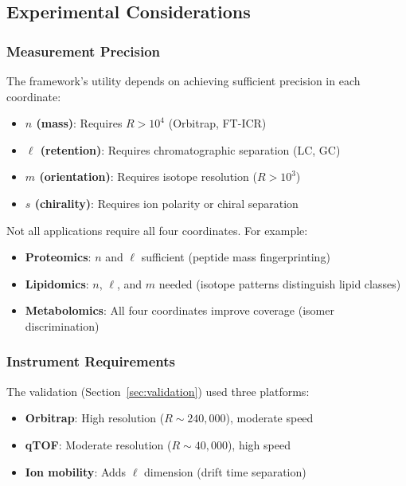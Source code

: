 \subsection{Experimental Considerations}

\subsubsection{Measurement Precision}

The framework's utility depends on achieving sufficient precision in each coordinate:

\begin{itemize}
    \item \textbf{$n$ (mass)}: Requires $R > 10^4$ (Orbitrap, FT-ICR)
    \item \textbf{$\ell$ (retention)}: Requires chromatographic separation (LC, GC)
    \item \textbf{$m$ (orientation)}: Requires isotope resolution ($R > 10^3$)
    \item \textbf{$s$ (chirality)}: Requires ion polarity or chiral separation
\end{itemize}

Not all applications require all four coordinates. For example:
\begin{itemize}
    \item \textbf{Proteomics}: $n$ and $\ell$ sufficient (peptide mass fingerprinting)
    \item \textbf{Lipidomics}: $n$, $\ell$, and $m$ needed (isotope patterns distinguish lipid classes)
    \item \textbf{Metabolomics}: All four coordinates improve coverage (isomer discrimination)
\end{itemize}

\subsubsection{Instrument Requirements}

The validation (Section~\ref{sec:validation}) used three platforms:
\begin{itemize}
    \item \textbf{Orbitrap}: High resolution ($R \sim 240{,}000$), moderate speed
    \item \textbf{qTOF}: Moderate resolution ($R \sim 40{,}000$), high speed
    \item \textbf{Ion mobility}: Adds $\ell$ dimension (drift time separation)
\end{itemize}

